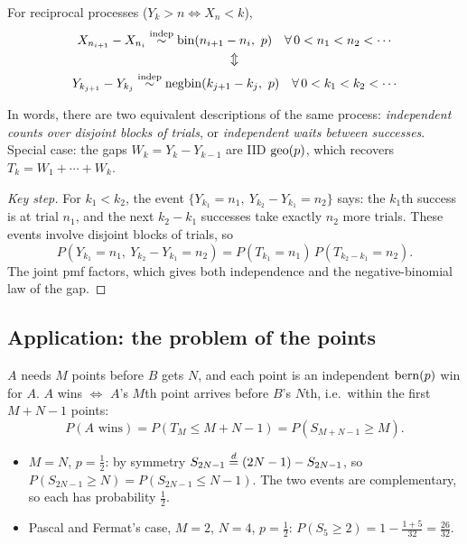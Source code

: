 \begin{theorem}[Reciprocity]\label{thm:recip}
For reciprocal processes ($Y_k > n \iff X_n < k$),
\begin{gather*}
X_{n_{i+1}} - X_{n_i} \overset{\text{indep}}{\sim} \bin(n_{i+1}-n_i,\ p)\quad \forall\, 0<n_1<n_2<\cdots\\
\Updownarrow\\
Y_{k_{j+1}} - Y_{k_j} \overset{\text{indep}}{\sim} \negbin(k_{j+1}-k_j,\ p)\quad \forall\, 0<k_1<k_2<\cdots
\end{gather*}
\end{theorem}
\begin{remark}
In words, there are two equivalent descriptions of the same process: \emph{independent counts over disjoint blocks of trials}, or \emph{independent waits between successes}. Special case: the gaps $W_k = Y_k - Y_{k-1}$ are IID $\operatorname{geo}(p)$, which recovers $T_k = W_1+\cdots+W_k$.
\end{remark}
\begin{proof}[Key step]
For $k_1 < k_2$, the event $\{Y_{k_1}=n_1,\ Y_{k_2}-Y_{k_1}=n_2\}$ says: the $k_1$th success is at trial $n_1$, and the next $k_2-k_1$ successes take exactly $n_2$ more trials. These events involve disjoint blocks of trials, so
\[
P(Y_{k_1}=n_1,\ Y_{k_2}-Y_{k_1}=n_2) = P(T_{k_1}=n_1)\,P(T_{k_2-k_1}=n_2).
\]
The joint pmf factors, which gives both independence and the negative-binomial law of the gap.
\end{proof}

\subsection{Application: the problem of the points}

$A$ needs $M$ points before $B$ gets $N$, and each point is an independent $\operatorname{bern}(p)$ win for $A$. $A$ wins $\iff$ $A$'s $M$th point arrives before $B$'s $N$th, i.e.\ within the first $M+N-1$ points:
\[
P(A \text{ wins}) = P(T_M \le M+N-1) = P(S_{M+N-1} \ge M).
\]
\begin{example}
\begin{itemize}[nosep]
  \item $M=N$, $p=\tfrac12$: by symmetry $S_{2N-1} \overset{d}{=} (2N-1) - S_{2N-1}$, so $P(S_{2N-1}\ge N) = P(S_{2N-1}\le N-1)$. The two events are complementary, so each has probability $\tfrac12$.
  \item Pascal and Fermat's case, $M=2$, $N=4$, $p=\tfrac12$: $P(S_5\ge2) = 1-\frac{1+5}{32} = \frac{26}{32}$.
\end{itemize}
\end{example}

